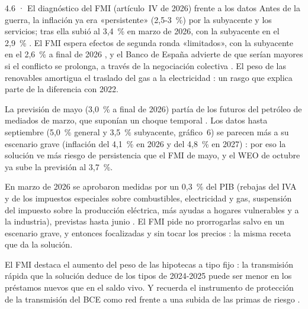 \begin{complemento}{4.6 · El diagnóstico del FMI (artículo~IV de 2026) frente a los datos}
 Antes de la guerra, la inflación ya era «persistente» (2,5-3~\%) por la subyacente y los servicios; tras ella subió al 3,4~\% en marzo de 2026, con la subyacente en el 2,9~\% . El FMI espera efectos de segunda ronda «limitados», con la subyacente en el 2,6~\% a final de 2026 , y el Banco de España advierte de que serían mayores si el conflicto se prolonga, a través de la negociación colectiva . El peso de las renovables amortigua el traslado del gas a la electricidad : un rasgo que explica parte de la diferencia con 2022.

 La previsión de mayo (3,0~\% a final de 2026) partía de los futuros del petróleo de mediados de marzo, que suponían un choque temporal . Los datos hasta septiembre (5,0~\% general y 3,5~\% subyacente, gráfico~6) se parecen más a su escenario grave (inflación del 4,1~\% en 2026 y del 4,8~\% en 2027) : por eso la solución ve más riesgo de persistencia que el FMI de mayo, y el WEO de octubre ya sube la previsión al 3,7~\%.

 En marzo de 2026 se aprobaron medidas por un 0,3~\% del PIB (rebajas del IVA y de los impuestos especiales sobre combustibles, electricidad y gas, suspensión del impuesto sobre la producción eléctrica, más ayudas a hogares vulnerables y a la industria), previstas hasta junio . El FMI pide no prorrogarlas salvo en un escenario grave, y entonces focalizadas y sin tocar los precios : la misma receta que da la solución.

 El FMI destaca el aumento del peso de las hipotecas a tipo fijo : la transmisión rápida que la solución deduce de los tipos de 2024-2025 puede ser menor en los préstamos nuevos que en el saldo vivo. Y recuerda el instrumento de protección de la transmisión del BCE como red frente a una subida de las primas de riesgo .
\end{complemento}
